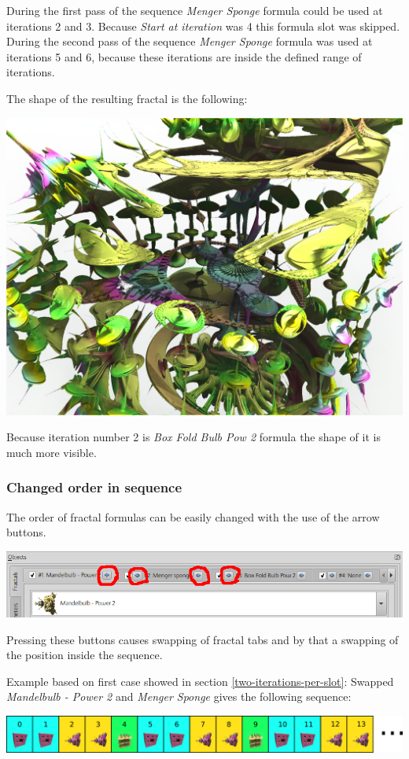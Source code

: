 During the first pass of the sequence \emph{Menger Sponge} formula could be used at iterations 2 and 3.
Because \emph{Start at iteration} was 4 this formula slot was skipped.
During the second pass of the sequence \emph{Menger Sponge} formula was used at iterations 5 and 6,
because these iterations are inside the defined range of iterations.

The shape of the resulting fractal is the following:\nopagebreak

\includegraphics[width=0.7\linewidth]{img/manual/media/hybrid_sequence_example_4.png}

Because iteration number 2 is \emph{Box Fold Bulb Pow 2} formula the shape of it is much more visible.

\subsubsection{Changed order in sequence}

The order of fractal formulas can be easily changed with the use of the arrow buttons.

\includegraphics[width=\linewidth]{img/manual/media/fractal_tabs_with_defined_fractals_arrows.png}

Pressing these buttons causes swapping of fractal tabs and by that a swapping of the position inside the sequence.

Example based on first case showed in section \ref{two-iterations-per-slot}:
Swapped \emph{Mandelbulb - Power 2} and \emph{Menger Sponge} gives the following sequence:

\includegraphics[width=\linewidth]{img/manual/media/iteration_loop_hybrid_sequence_5.png}

